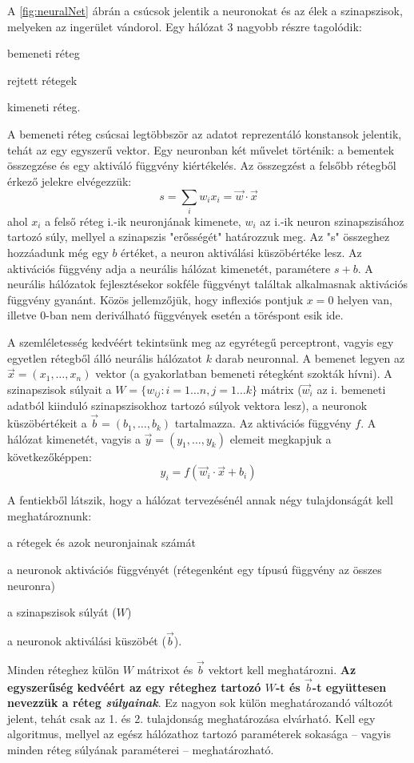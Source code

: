 A \ref{fig:neuralNet} ábrán a csúcsok jelentik a neuronokat és az élek a szinapszisok, melyeken az ingerület vándorol. Egy hálózat 3 nagyobb részre tagolódik:
\begin{enumerate*}[label={\alph*)},font=\bfseries]
	\item bemeneti réteg
	\item rejtett rétegek
	\item kimeneti réteg.
\end{enumerate*}
A bemeneti réteg csúcsai legtöbbször az adatot reprezentáló konstansok jelentik, tehát az egy egyszerű vektor.
Egy neuronban két művelet történik: a bementek összegzése és egy aktiváló függvény kiértékelés. Az összegzést a felsőbb rétegből érkező jelekre elvégezzük:
\begin{displaymath}
	s = \sum_i{w_ix_i} = \vec{w}\cdot\vec{x}
\end{displaymath}
ahol $x_i$ a felső réteg i.-ik neuronjának kimenete, $w_i$ az i.-ik neuron szinapszisához tartozó súly, mellyel a szinapszis "erősségét" határozzuk meg. Az "s" összeghez hozzáadunk még egy $b$ értéket, a neuron aktiválási küszöbértéke lesz.
Az aktivációs függvény adja a neurális hálózat kimenetét, paramétere $s+b$.
A neurális hálózatok fejlesztésekor sokféle függvényt találtak alkalmasnak aktivációs függvény gyanánt. Közös jellemzőjük, hogy inflexiós pontjuk $x=0$ helyen van, illetve 0-ban nem deriválható függvények esetén a töréspont esik ide.

A szemléletesség kedvéért tekintsünk meg az egyrétegű perceptront, vagyis egy egyetlen rétegből álló neurális hálózatot $k$ darab neuronnal. A bemenet legyen az $\vec{x}=(x_1,\dots,x_n)$ vektor (a gyakorlatban bemeneti rétegként szokták hívni). A szinapszisok súlyait a $W=\{w_{ij}:i=1\dots n,j=1\dots k\}$  mátrix ($\vec{w}_i$ az i. bemeneti adatból kiinduló szinapszisokhoz tartozó súlyok vektora lesz), a neuronok küszöbértékeit a $\vec{b}=(b_1,\dots,b_k)$ tartalmazza. Az aktivációs függvény $f$. A hálózat kimenetét, vagyis a  $\vec{y}=(y_1,\dots,y_k)$ elemeit megkapjuk a következőképpen:
\begin{displaymath}
	y_i = f(\vec{w}_i\cdot\vec{x}+b_i)
\end{displaymath}

A fentiekből látszik, hogy a hálózat tervezésénél annak négy tulajdonságát kell meghatároznunk:
\begin{enumerate*}
	\item a rétegek és azok neuronjainak számát
	\item a neuronok aktivációs függvényét (rétegenként egy típusú függvény az összes neuronra)
	\item a szinapszisok súlyát ($W$)
	\item a neuronok aktiválási küszöbét ($\vec{b}$).
\end{enumerate*}
Minden réteghez külön $W$ mátrixot és $\vec{b}$ vektort kell meghatározni. \textbf{Az egyszerűség kedvéért az egy réteghez tartozó $W$-t és $\vec{b}$-t együttesen nevezzük a réteg \emph{súlyainak}}. Ez nagyon sok külön meghatározandó változót jelent, tehát csak az 1. és 2. tulajdonság meghatározása elvárható. Kell egy algoritmus, mellyel az egész hálózathoz tartozó paraméterek sokasága -- vagyis minden réteg súlyának paraméterei -- meghatározható.



